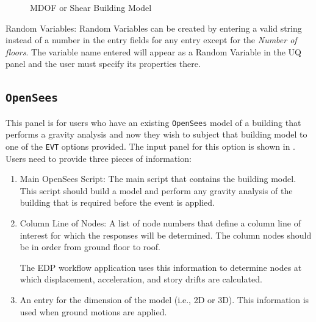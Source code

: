 \begin{figure}[!htbp]
  \caption{MDOF or Shear Building Model}
  \label{fig:mdof}
\end{figure}

Random Variables: Random Variables can be created by entering
a valid string instead of a number in the entry fields for any entry
except for the \emph{Number of floors}. The variable name entered will appear as
a Random Variable in the UQ panel and the user must specify its properties there.

\subsection{\texttt{OpenSees}}\label{sec:OpenSeesSIM}
This panel is for users who have an existing \texttt{OpenSees} model of a
building that performs a gravity analysis and now they wish to subject that
building model to one of the \texttt{EVT} options provided. The input panel
for this option is shown in . Users need to provide three pieces of information:
\begin{enumerate} 
\item Main OpenSees Script: The main script that contains the building
  model. This script should build a model and perform any gravity
  analysis of the building that is required before the event is
  applied.
\item Column Line of Nodes: A list of node numbers that define a column line of interest for which
  the responses will be determined. The column nodes should be in
  order from ground floor to roof. 
  
  The EDP workflow application uses this information to determine nodes at which
  displacement, acceleration, and story drifts are calculated.
\item An entry for the dimension of the model (i.e., 2D or 3D). This
  information is used when ground motions are applied.
\end{enumerate}


